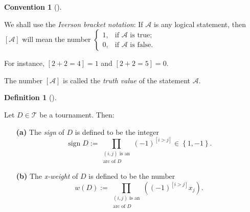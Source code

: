 \documentclass[numbers=enddot,12pt,final,onecolumn,notitlepage]{scrartcl}%
\numberwithin{exer}{subsection}
\theoremstyle{definition}
\newtheorem{defi}[theo]{Definition}
\newenvironment{definition}[1][]
{\begin{defi}[#1]\begin{leftbar}}
{\end{leftbar}\end{defi}}
\newtheorem{conv}[theo]{Convention}
\newenvironment{convention}[1][]
{\begin{conv}[#1]\begin{leftbar}}
{\end{leftbar}\end{conv}}
\let\prodnonlimits\prod
\renewcommand{\prod}{\prodnonlimits\limits}
\begin{document}
\begin{convention}
We shall use the \emph{Iverson bracket notation}: If $\mathcal{A}$ is any
logical statement, then $\left[  \mathcal{A}\right]  $ will mean the number $%
\begin{cases}
1, & \text{if }\mathcal{A}\text{ is true;}\\
0, & \text{if }\mathcal{A}\text{ is false.}%
\end{cases}
$

For instance, $\left[  2+2=4\right]  =1$ and $\left[  2+2=5\right]  =0$.

The number $\left[  \mathcal{A}\right]  $ is called the \emph{truth value} of
the statement $\mathcal{A}$.
\end{convention}

\begin{definition}
\label{def.tour1n.wD}Let $D\in\mathcal{T}$ be a tournament. Then:

\begin{enumerate}
\item[\textbf{(a)}] The \emph{sign} of $D$ is defined to be the integer%
\begin{equation}
\operatorname*{sign}D:=\prod_{\substack{\left(  i,j\right)  \text{ is
an}\\\text{arc of }D}}\left(  -1\right)  ^{\left[  i>j\right]  }\in\left\{
1,-1\right\}  . \label{eq.def.tour1n.wD.sign}%
\end{equation}


\item[\textbf{(b)}] The \emph{x-weight} of $D$ is defined to be the number%
\begin{equation}
w\left(  D\right)  :=\prod_{\substack{\left(  i,j\right)  \text{ is
an}\\\text{arc of }D}}\left(  \left(  -1\right)  ^{\left[  i>j\right]  }%
x_{j}\right)  . \label{eq.def.tour1n.wD.eq}%
\end{equation}

\end{enumerate}
\end{definition}
\end{document}
